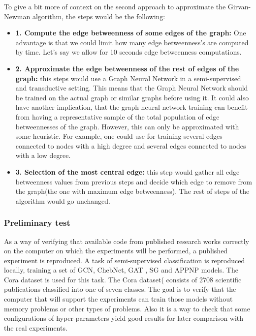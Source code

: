 To give a bit more of context on the second approach to approximate the Girvan-Newman algorithm, the steps would be the following:
\begin{itemize}
	\item \textbf{1. Compute the edge betweenness of some edges of the graph:} One advantage is that we could limit how many edge betweenness's are computed by time. Let's say we allow for 10 seconds edge betweenness computations.
	\item \textbf{2. Approximate the edge betweenness of the rest of edges of the graph:} this steps would use a Graph Neural Network in a semi-supervised and transductive setting. This means that the Graph Neural Network should be trained on the actual graph or similar graphs before using it. It could also have another implication, that the graph neural network training can benefit from having a representative sample of the total population of edge betweennesses of the graph. However, this can only be approximated with some heuristic. For example, one could use for training several edges connected to nodes with a high degree and several edges connected to nodes with a low degree.
	\item \textbf{3. Selection of the most central edge:} this step would gather all edge betweenness values from previous steps and decide which edge to remove from the graph(the one with maximum edge betweenness). The rest of steps of the algorithm would go unchanged.
\end{itemize}




\subsubsection{Preliminary test}

As a way of verifying that available code from published research works correctly on the computer on which the experiments will be performed, a published experiment is reproduced. A task of semi-supervised classification is reproduced locally, training a set of GCN, ChebNet, GAT , SG and APPNP models. The Cora dataset is used for this task.  The Cora dataset(\cite{sen2008collective} consists of 2708 scientific publications classified into one of seven classes. The goal is to verify that the computer that will support the experiments can train those models without memory problems or other types of problems. Also it is a way to check that some configurations of hyper-parameters yield good results for later comparison with the real experiments. 


